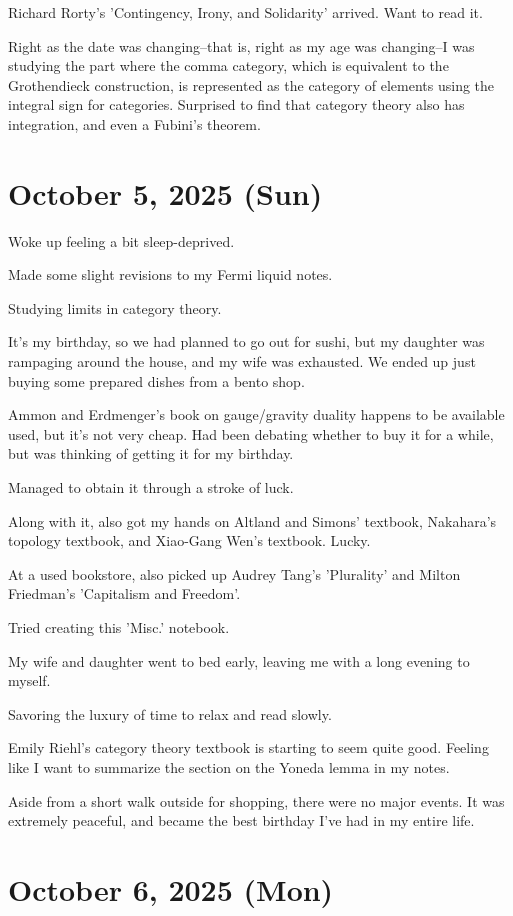\documentclass[uplatex]{jsarticle}
\begin{document}
Richard Rorty's 'Contingency, Irony, and Solidarity' arrived. Want to read it.

Right as the date was changing--that is, right as my age was changing--I was studying the part where the comma category, which is equivalent to the Grothendieck construction, is represented as the category of elements using the integral sign for categories.
Surprised to find that category theory also has integration, and even a Fubini's theorem.

\section{October 5, 2025 (Sun)}

Woke up feeling a bit sleep-deprived.

Made some slight revisions to my Fermi liquid notes.

Studying limits in category theory.

It's my birthday, so we had planned to go out for sushi, but my daughter was rampaging around the house, and my wife was exhausted. We ended up just buying some prepared dishes from a bento shop.

Ammon and Erdmenger's book on gauge/gravity duality happens to be available used, but it's not very cheap.
Had been debating whether to buy it for a while, but was thinking of getting it for my birthday.

Managed to obtain it through a stroke of luck.

Along with it, also got my hands on Altland and Simons' textbook, Nakahara's topology textbook, and Xiao-Gang Wen's textbook. Lucky.

At a used bookstore, also picked up Audrey Tang's 'Plurality' and Milton Friedman's 'Capitalism and Freedom'.

Tried creating this 'Misc.' notebook.

My wife and daughter went to bed early, leaving me with a long evening to myself.

Savoring the luxury of time to relax and read slowly.

Emily Riehl's category theory textbook is starting to seem quite good.
Feeling like I want to summarize the section on the Yoneda lemma in my notes.

Aside from a short walk outside for shopping, there were no major events. It was extremely peaceful, and became the best birthday I've had in my entire life.

\section{October 6, 2025 (Mon)}
\end{document}
